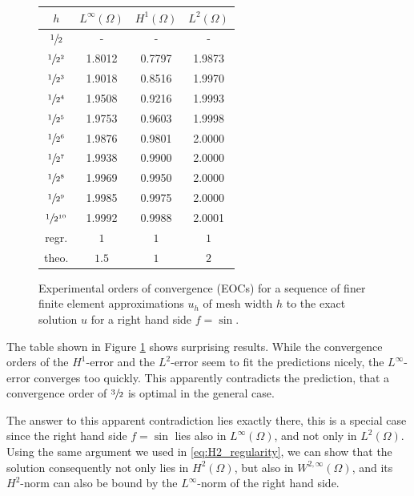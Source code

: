 \documentclass[headsepline,footsepline,footinclude=false,oneside,fontsize=11pt,paper=a4,listof=totoc,bibliography=totoc]{scrbook} %
\begin{document}
\begin{figure}[h!] 
	\centering
	\bgroup
	\def\arraystretch{1.3}
	\begin{tabular}{cccc}
		\hline
		$h$ & $L^\infty(\Omega)$ & $H^1(\Omega)$ & $L^2(\Omega)$ \\
		\hline
		$\sfrac{1}{2}$      	&	-	&	-	&	- \\
		$\sfrac{1}{2^2}$	&	\num{1.8012}	&	\num{0.7797}	&	\num{1.9873} \\
		$\sfrac{1}{2^3}$	&	\num{1.9018}	&	\num{0.8516}	&	\num{1.9970} \\
		$\sfrac{1}{2^4}$	&	\num{1.9508}	&	\num{0.9216}	&	\num{1.9993} \\
		$\sfrac{1}{2^5}$	&	\num{1.9753}	&	\num{0.9603}	&	\num{1.9998} \\
		$\sfrac{1}{2^6}$	&	\num{1.9876}	&	\num{0.9801}	&	\num{2.0000} \\
		$\sfrac{1}{2^7}$	&	\num{1.9938}	&	\num{0.9900}	&	\num{2.0000} \\
		$\sfrac{1}{2^8}$	&	\num{1.9969}	&	\num{0.9950}	&	\num{2.0000} \\
		$\sfrac{1}{2^9}$	&	\num{1.9985}	&	\num{0.9975}	&	\num{2.0000} \\
		$\sfrac{1}{2^{10}}$	&	\num{1.9992}	&	\num{0.9988}	&	\num{2.0001} \\
		\hline
		regr. & $1$ & $1$ & $1$ \\
		\hline										
		theo. & $1.5$ & $1$ & $2$
	\end{tabular}
	\egroup
	\caption[EOCs for  $f = \sin$]{Experimental orders of convergence (EOCs) for a sequence of finer finite element approximations $u_h$ of mesh width $h$ to the exact solution $u$ for a right hand side $f = \sin$.}
	\label{fig:eocs_sin}
\end{figure}

The table shown in Figure \ref{fig:eocs_sin} shows surprising results. While the convergence orders of the $H^1$-error and the $L^2$-error seem to fit the predictions nicely, the $L^\infty$-error converges too quickly. This apparently contradicts the prediction, that a convergence order of $\sfrac{3}{2}$ is optimal in the general case. 

The answer to this apparent contradiction lies exactly there, this is a special case since the right hand side $f = \sin$ lies also in $L^\infty(\Omega)$, and not only in $L^2(\Omega)$. Using the same argument we used in \eqref{eq:H2_regularity}, we can show that the solution consequently not only lies in $H^2(\Omega)$, but also in $W^{2,\infty}(\Omega)$, and its $H^2$-norm can also be bound by the $L^\infty$-norm of the right hand side. 
\end{document}
